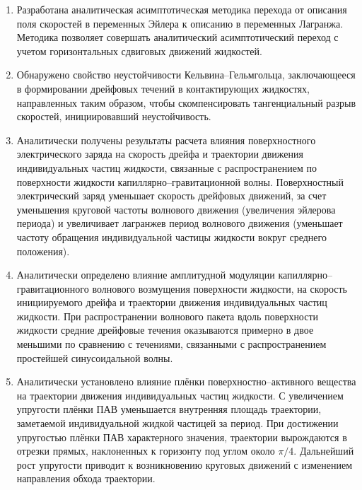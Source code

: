 \begin{enumerate}
	\item Разработана аналитическая асимптотическая методика перехода от описания поля скоростей в переменных Эйлера к описанию в переменных Лагранжа. Методика позволяет совершать аналитический асимптотический переход с учетом горизонтальных сдвиговых движений жидкостей.
	\item Обнаружено свойство неустойчивости Кельвина--Гельмгольца, заключающееся в формировании дрейфовых течений в контактирующих жидкостях, направленных таким образом, чтобы скомпенсировать тангенциальный разрыв скоростей, инициировавший неустойчивость.
	\item Аналитически получены результаты расчета влияния поверхностного электрического заряда на скорость дрейфа и траектории движения индивидуальных частиц жидкости, связанные с распространением по поверхности жидкости капиллярно--гравитационной волны. Поверхностный электрический заряд уменьшает скорость дрейфовых движений, за счет уменьшения круговой частоты волнового движения (увеличения эйлерова периода) и увеличивает лагранжев период волнового движения (уменьшает частоту обращения индивидуальной частицы жидкости вокруг среднего положения). 
	\item Аналитически определено влияние амплитудной модуляции капиллярно--гравитационного волнового возмущения поверхности жидкости, на скорость инициируемого дрейфа и траектории движения индивидуальных частиц жидкости. При распространении волнового пакета вдоль поверхности жидкости средние дрейфовые течения оказываются примерно в двое меньшими по сравнению с течениями, связанными с распространением простейшей синусоидальной волны. 
	\item Аналитически установлено влияние плёнки поверхностно--активного вещества на траектории движения индивидуальных частиц жидкости. С увеличением упругости плёнки ПАВ уменьшается внутренняя площадь траектории, заметаемой индивидуальной жидкой частицей за период. При достижении упругостью плёнки ПАВ характерного значения, траектории вырождаются в отрезки прямых, наклоненных к горизонту под углом около $ \pi/4 $. Дальнейший рост упругости приводит к возникновению круговых движений с изменением направления обхода траектории.

\end{enumerate}
